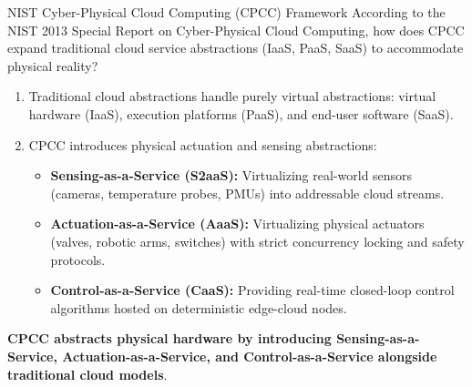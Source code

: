 \begin{solved}{NIST Cyber-Physical Cloud Computing (CPCC) Framework}
\Given According to the NIST 2013 Special Report on Cyber-Physical Cloud Computing, how does CPCC expand traditional cloud service abstractions (IaaS, PaaS, SaaS) to accommodate physical reality?
\Steps
\begin{enumerate}[leftmargin=*]
  \item Traditional cloud abstractions handle purely virtual abstractions: virtual hardware (IaaS), execution platforms (PaaS), and end-user software (SaaS).
  \item CPCC introduces physical actuation and sensing abstractions:
    \begin{itemize}
      \item \textbf{Sensing-as-a-Service (S2aaS):} Virtualizing real-world sensors (cameras, temperature probes, PMUs) into addressable cloud streams.
      \item \textbf{Actuation-as-a-Service (AaaS):} Virtualizing physical actuators (valves, robotic arms, switches) with strict concurrency locking and safety protocols.
      \item \textbf{Control-as-a-Service (CaaS):} Providing real-time closed-loop control algorithms hosted on deterministic edge-cloud nodes.
    \end{itemize}
\end{enumerate}
\Answer \textbf{CPCC abstracts physical hardware by introducing Sensing-as-a-Service, Actuation-as-a-Service, and Control-as-a-Service alongside traditional cloud models}.
\end{solved}

